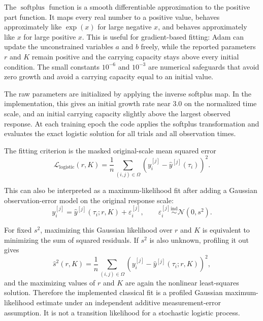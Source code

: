         The $\operatorname{softplus}$ function is a smooth differentiable
    approximation to the positive part function. It maps every real number
    to a positive value, behaves approximately like $\exp(x)$ for large
    negative $x$, and behaves approximately like $x$ for large positive
    $x$. This is useful for gradient-based fitting:
    Adam can update the unconstrained variables $a$ and $b$ freely, while
    the reported parameters $r$ and $K$ remain positive and the carrying
    capacity stays above every initial condition. The small constants
    $10^{-6}$ and $10^{-3}$ are numerical safeguards that avoid zero growth
    and avoid a carrying capacity equal to an initial value.

        The raw parameters are initialized by applying the inverse softplus
    map. In the
    implementation, this gives an initial growth rate near $3.0$ on the
    normalized time scale, and an initial carrying capacity slightly above the
    largest observed response. At each training epoch the code applies the
    softplus    transformation and evaluates the exact logistic solution for
    all trials and all observation times.

        The fitting criterion is the masked original-scale mean squared error
    \begin{equation}
        \label{eqn:likelihood_ode}
          \mathcal L_{\mathrm{logistic}}(r,K)
          =
            \frac{1}{n}
            \sum_{(i,j)\in\Omega}
            \left(y_i^{[j]}-\widehat y^{[j]}(\tau_i)\right)^2.
    \end{equation}

    This can also be interpreted as a maximum-likelihood fit after adding a
    Gaussian observation-error model on the original response scale:
    \begin{equation}
        y_i^{[j]}
        =
        \widehat y^{[j]}(\tau_i;r,K)+\varepsilon_i^{[j]},
        \qquad
        \varepsilon_i^{[j]}\stackrel{\mathrm{ind}}{\sim}
        \mathcal N(0,s^2).
    \end{equation}

        For fixed $s^2$, maximizing this Gaussian likelihood over $r$ and
    $K$ is equivalent to minimizing the sum of squared residuals.
    If $s^2$ is also unknown, profiling it out gives
    $$
        \widehat s^2(r,K)
        =
            \frac{1}{n}
            \sum_{(i,j)\in\Omega}
            \left(y_i^{[j]}-\widehat y^{[j]}(\tau_i;r,K)\right)^2,
    $$
and the maximizing values of $r$ and $K$ are again the nonlinear least-squares
solution. Therefore the implemented classical fit is a profiled Gaussian
maximum-likelihood estimate under an independent additive measurement-error
assumption. It is not a transition likelihood for a stochastic logistic process.

